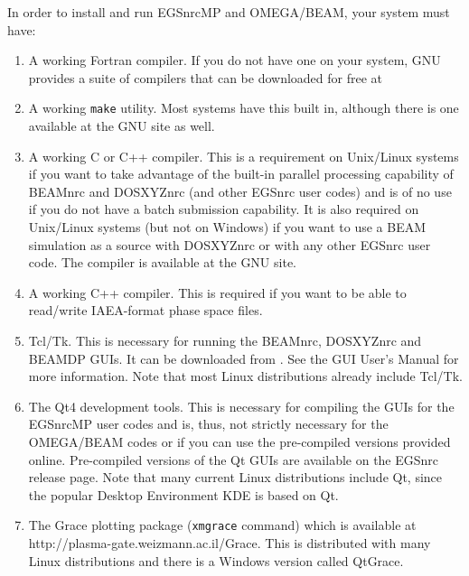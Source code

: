 \documentclass[12pt,twoside]{article}
\begin{document}
In order to install and run EGSnrcMP and OMEGA/BEAM, your system must have:
\begin{enumerate}
\item A working Fortran compiler.  If you do not have one on
your system, GNU provides a suite of compilers that can be downloaded
for free at 
\item A working {\tt make} utility.  Most systems have this built in, although
there is one available at the GNU site as well.
\item A working C or C++ compiler.  This is a requirement on Unix/Linux
systems if you want to take advantage of
the built-in parallel processing capability of BEAMnrc and DOSXYZnrc
(and other EGSnrc user codes) and is of no use if you do not
have a batch submission capability.  It is also required on Unix/Linux
systems (but not on Windows) if you want to use a BEAM simulation as a
source with DOSXYZnrc or with any other EGSnrc user code.
The compiler is available at the GNU site.
\item A working C++ compiler.  This is required if you want to be
able to read/write IAEA-format phase space files.
\item Tcl/Tk.  This is necessary for running the BEAMnrc, DOSXYZnrc and
BEAMDP GUIs.  It can be downloaded from
.  See the GUI User's Manual\cite{Tr04} for
more information.  Note that most Linux distributions already include
Tcl/Tk.
\item The Qt4 development tools. This is necessary for
compiling the GUIs for the EGSnrcMP user codes and is, thus,
not strictly necessary for the OMEGA/BEAM codes or if you can use the
pre-compiled versions provided online. Pre-compiled versions of
the Qt GUIs are available on the EGSnrc release page.
Note that many current Linux distributions
include Qt, since the popular Desktop Environment KDE is based on Qt.

\item The Grace plotting package ({\tt xmgrace} command) which is available at\\
 {http://plasma-gate.weizmann.ac.il/Grace}. This is distributed with many
Linux distributions and there is a Windows version called QtGrace.
\end{enumerate}
\end{document}

